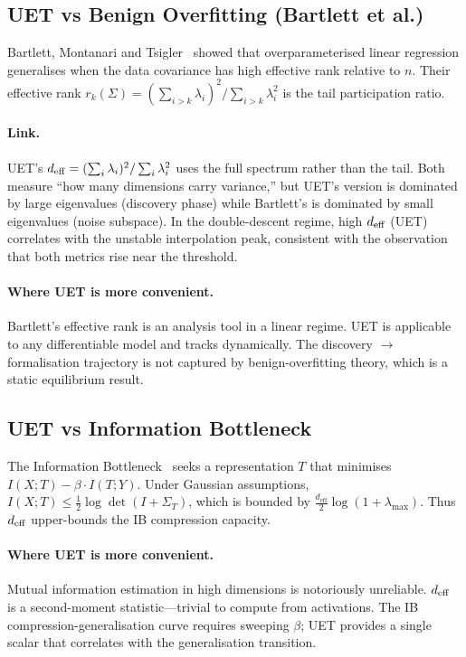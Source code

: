 \subsection{UET vs Benign Overfitting (Bartlett et al.)}
\label{sec:vs-benign}

Bartlett, Montanari and Tsigler~\citep{bartlett2020benign} showed that
overparameterised linear regression generalises when the data covariance
has high effective rank relative to $n$.
Their effective rank $r_k(\Sigma) = (\sum_{i > k} \lambda_i)^2 / \sum_{i > k} \lambda_i^2$
is the tail participation ratio.

\paragraph{Link.}
UET's $d_{\mathrm{eff}} = (\sum_i \lambda_i)^2 / \sum_i \lambda_i^2$ uses the full spectrum
rather than the tail.
Both measure ``how many dimensions carry variance,'' but UET's version is
dominated by large eigenvalues (discovery phase) while Bartlett's is dominated
by small eigenvalues (noise subspace).
In the double-descent regime, high $d_{\mathrm{eff}}$ (UET) correlates with the unstable
interpolation peak, consistent with the observation that both metrics rise
near the threshold.

\paragraph{Where UET is more convenient.}
Bartlett's effective rank is an analysis tool in a linear regime.
UET is applicable to any differentiable model and tracks dynamically.
The discovery $\to$ formalisation trajectory is not captured by benign-overfitting
theory, which is a static equilibrium result.

\subsection{UET vs Information Bottleneck}
\label{sec:vs-ib}

The Information Bottleneck~\citep{tishby2015deep} seeks a representation $T$
that minimises $I(X; T) - \beta \cdot I(T; Y)$.
Under Gaussian assumptions, $I(X; T) \leq \tfrac{1}{2} \log \det(I + \Sigma_T)$,
which is bounded by $\tfrac{d_\mathrm{eff}}{2} \log(1 + \lambda_{\max})$.
Thus $d_{\mathrm{eff}}$ upper-bounds the IB compression capacity.

\paragraph{Where UET is more convenient.}
Mutual information estimation in high dimensions is notoriously unreliable.
$d_{\mathrm{eff}}$ is a second-moment statistic---trivial to compute from activations.
The IB compression-generalisation curve requires sweeping $\beta$; UET provides
a single scalar that correlates with the generalisation transition.

